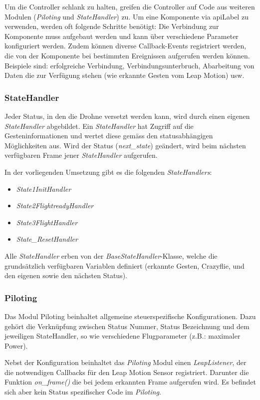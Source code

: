 Um die Controller schlank zu halten, greifen die Controller auf Code aus weiteren Modulen (\textit{Piloting} und \textit{StateHandler}) zu.
Um eine Komponente via \gls{apiLabel} zu verwenden, werden oft folgende Schritte benötigt:
Die Verbindung zur Komponente muss aufgebaut werden und kann über verschiedene Parameter konfiguriert werden.
Zudem können diverse Callback-Events registriert werden, die von der Komponente bei bestimmten Ereignissen aufgerufen werden können. Beispiele sind: erfolgreiche Verbindung, Verbindungsunterbruch, Abarbeitung von Daten die zur Verfügung stehen (wie erkannte Gesten vom Leap Motion) usw.

\subsubsection{StateHandler}
Jeder Status, in den die Drohne versetzt werden kann, wird durch einen eigenen \textit{StateHandler} abgebildet.
Ein \textit{StateHandler} hat Zugriff auf die Gesteninformationen und wertet diese gemäss den statusabhängigen Möglichkeiten aus.
Wird der Status (\textit{next\_state}) geändert, wird beim nächsten verfügbaren Frame jener \textit{StateHandler} aufgerufen.

In der vorliegenden Umsetzung gibt es die folgenden \textit{StateHandlers}:
\begin{itemize}
	\item \textit{State1InitHandler}
	\item \textit{State2FlightreadyHandler}
	\item \textit{State3FlightHandler}
	\item \textit{State\_ResetHandler}
\end{itemize}
Alle \textit{StateHandler} erben von der \textit{BaseStateHandler}-Klasse, welche die grundsätzlich verfügbaren Variablen definiert (erkannte Gesten, Crazyflie, und den eigenen sowie den nächsten Status).

\subsubsection{Piloting}
Das Modul Piloting beinhaltet allgemeine steuerspezifische Konfigurationen.
Dazu gehört die Verknüpfung zwischen Status Nummer, Status Bezeichnung und dem jeweiligen StateHandler, so wie verschiedene Flugparameter (z.B.: maximaler Power).

Nebst der Konfiguration beinhaltet das \textit{Piloting} Modul einen \textit{LeapListener}, der die notwendigen Callbacks für den Leap Motion Sensor registriert. Darunter die Funktion \textit{on\_frame()} die bei jedem erkannten Frame aufgerufen wird.
Es befindet sich aber kein Status spezifischer Code im \textit{Piloting}.

